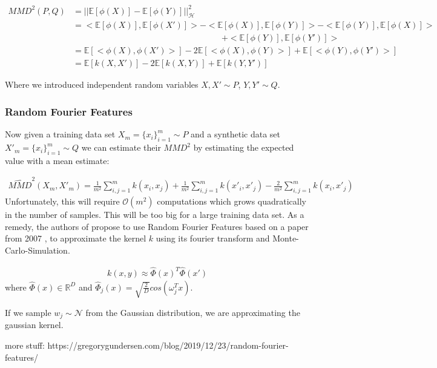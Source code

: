 \begin{align}
    MMD^2(P,Q) &= || \mathbb{E}[\phi(X)] - \mathbb{E}[\phi(Y)] ||^2_\mathcal{H} \nonumber \\
    &= <\mathbb{E}[\phi(X)], \mathbb{E}[\phi(X')]> - <\mathbb{E}[\phi(X)], \mathbb{E}[\phi(Y)]> - <\mathbb{E}[\phi(Y)], \mathbb{E}[\phi(X)]> \nonumber \\ &\phantom{mmmmmmmmmmmmmmmmmmmm}+ <\mathbb{E}[\phi(Y)], \mathbb{E}[\phi(Y')]> \nonumber \\
    &= \mathbb{E}[<\phi(X), \phi(X')>] - 2 \mathbb{E}[<\phi(X), \phi(Y)>] + \mathbb{E}[<\phi(Y), \phi(Y')>] \nonumber \\
    &= \mathbb{E}[k(X,X')] - 2 \mathbb{E}[k(X,Y)] + \mathbb{E}[k(Y,Y')]
\end{align}

Where we introduced independent random variables $X,X' \sim P$, $Y,Y' \sim Q$.

\subsubsection{Random Fourier Features}

Now given a training data set $X_m = \{x_i\}_{i=1}^m \sim P$ and a synthetic data set $X'_m = \{x_i\}_{i=1}^m \sim Q$ we can estimate their $MMD^2$ by estimating the expected value with a mean estimate:

\begin{align}
    \widehat{MMD}^2(X_m, X'_m) = \frac{1}{m^2} \sum_{i,j=1}^m k(x_i,x_j) + \frac{1}{m^2} \sum_{i,j=1}^m k(x'_i,x'_j) - \frac{2}{m^2} \sum_{i,j=1}^m k(x_i,x'_j)
\end{align}
Unfortunately, this will require $\mathcal{O}(m^2)$ computations which grows quadratically in the number of samples. This will be too big for a large training data set. As a remedy, the authors of \parencite{dpmerf} propose to use Random Fourier Features based on a paper from 2007 \parencite[see][]{rff}, to approximate the kernel $k$ using its fourier transform and Monte-Carlo-Simulation.

\begin{align}
    k(x,y) \approx \hat{\Phi}(x)^T \hat{\Phi}(x')
\end{align}
where $\hat{\Phi}(x) \in \mathbb{R}^D$ and $\hat{\Phi}_j(x) = \sqrt{\frac{2}{D}} cos (\omega_j^T x)$.

If we sample $w_j \sim \mathcal{N}$ from the Gaussian distribution, we are approximating the gaussian kernel.

more stuff: https://gregorygundersen.com/blog/2019/12/23/random-fourier-features/

